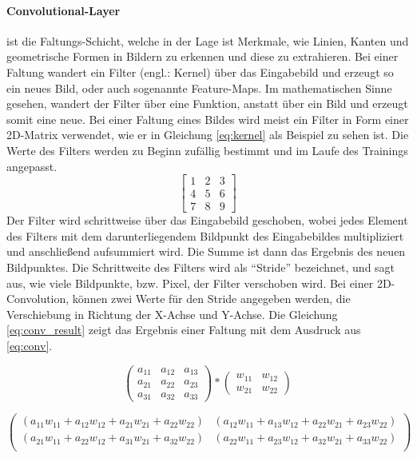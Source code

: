 \paragraph{Convolutional-Layer} ist die Faltungs-Schicht, welche in der Lage ist Merkmale, wie Linien, Kanten und geometrische Formen in Bildern zu erkennen und diese zu extrahieren. Bei einer Faltung wandert ein Filter (engl.: Kernel) über das Eingabebild und erzeugt so ein neues Bild, oder auch sogenannte Feature-Maps. Im mathematischen Sinne gesehen, wandert der Filter über eine Funktion, anstatt über ein Bild und erzeugt somit eine neue. Bei einer Faltung eines Bildes wird meist ein Filter in Form einer 2D-Matrix verwendet, wie er in Gleichung \ref{eq:kernel} als Beispiel zu sehen ist. Die Werte des Filters werden zu Beginn zufällig bestimmt und im Laufe des Trainings angepasst.
\begin{equation}
\begin{bmatrix}
	1 & 2 & 3 \\
	4 & 5 & 6 \\
    7 & 8 & 9
\end{bmatrix}
\label{eq:kernel}
\end{equation}
Der Filter wird schrittweise über das Eingabebild geschoben, wobei jedes Element des Filters mit dem darunterliegendem Bildpunkt des Eingabebildes multipliziert und anschließend aufsummiert wird. Die Summe ist dann das Ergebnis des neuen Bildpunktes. Die Schrittweite des Filters wird als ``Stride'' bezeichnet, und sagt aus, wie viele Bildpunkte, bzw. Pixel, der Filter verschoben wird. Bei einer 2D-Convolution, können zwei Werte für den Stride angegeben werden, die Verschiebung in Richtung der X-Achse und Y-Achse. Die Gleichung \ref{eq:conv_result} zeigt das Ergebnis einer Faltung mit dem Ausdruck aus \ref{eq:conv}.

\begin{equation}
	\begin{pmatrix}
		a_{11} & a_{12} & a_{13} \\
		a_{21} & a_{22} & a_{23} \\
		a_{31} & a_{32} & a_{33}
	\end{pmatrix}
	*
	\begin{pmatrix}
		w_{11} & w_{12} \\
		w_{21} & w_{22}
	\end{pmatrix}
	\label{eq:conv}
\end{equation}

\begin{equation}
	\begin{pmatrix}
		(a_{11}w_{11} + a_{12}w_{12} + a_{21}w_{21} + a_{22}w_{22}) & (a_{12}w_{11} + a_{13}w_{12} + a_{22}w_{21} + a_{23}w_{22}) \\
		(a_{21}w_{11} + a_{22}w_{12} + a_{31}w_{21} + a_{32}w_{22}) & (a_{22}w_{11} + a_{23}w_{12} + a_{32}w_{21} + a_{33}w_{22}) \\
	\end{pmatrix}
	\label{eq:conv_result}
\end{equation}

